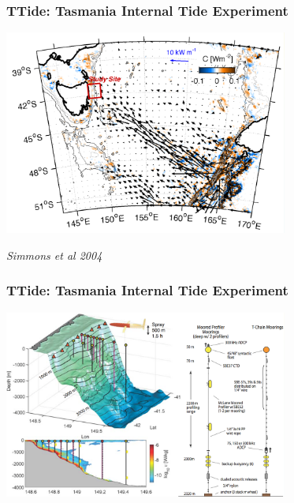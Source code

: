 \documentclass[]{beamer}
\begin{document}
\begin{frame}
  \frametitle{TTide: Tasmania Internal Tide Experiment}
  \begin{center}
  \includegraphics[width=0.7\textwidth]{doc/SiteMap.png}
  \end{center}
  \emph{Simmons et al 2004}
\end{frame}

\begin{frame}
  \frametitle{TTide: Tasmania Internal Tide Experiment}
  \begin{center}
  \includegraphics[width=0.7\textwidth]{doc/ExperimentSketch.png}
  \end{center}
\end{frame}
\end{document}

